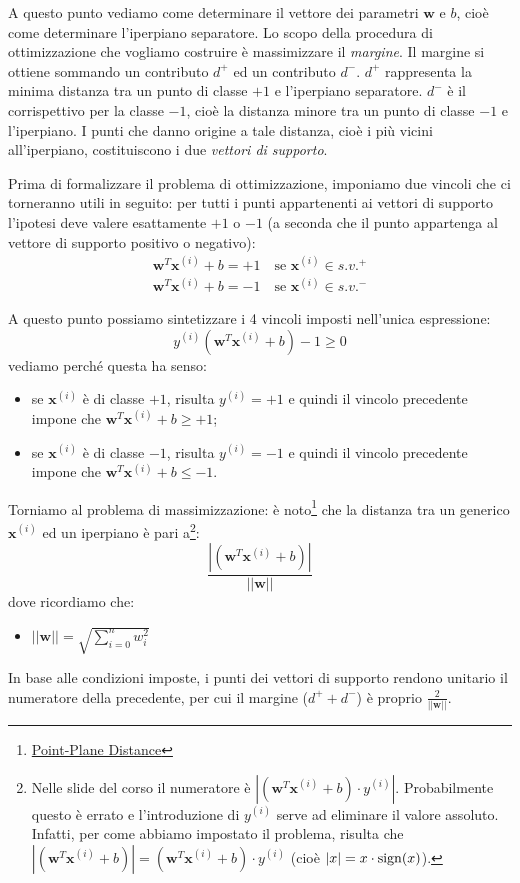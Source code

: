 A questo punto vediamo come determinare il vettore dei parametri $\mathbf{w}$ e $b$, cioè come determinare l'iperpiano separatore. Lo scopo della procedura di ottimizzazione che vogliamo costruire è massimizzare il \emph{margine}. Il margine si ottiene sommando un contributo $d^+$ ed un contributo $d^-$. $d^+$ rappresenta la minima distanza tra un punto di classe $+1$ e l'iperpiano separatore. $d^-$ è il corrispettivo per la classe $-1$, cioè la distanza minore tra un punto di classe $-1$ e l'iperpiano. I punti che danno origine a tale distanza, cioè i più vicini all'iperpiano, costituiscono i due \emph{vettori di supporto}.

Prima di formalizzare il problema di ottimizzazione, imponiamo due vincoli che ci torneranno utili in seguito: per tutti i punti appartenenti ai vettori di supporto l'ipotesi deve valere esattamente $+1$ o $-1$ (a seconda che il punto appartenga al vettore di supporto positivo o negativo):
\begin{gather*}
\mathbf{w}^T \mathbf{x}^{(i)} + b = +1 \quad \text{se }  \mathbf{x}^{(i)} \in s.v.^+\\
\mathbf{w}^T \mathbf{x}^{(i)} + b = -1 \quad \text{se }  \mathbf{x}^{(i)} \in s.v.^-
\end{gather*}

A questo punto possiamo sintetizzare i 4 vincoli imposti nell'unica espressione:
\begin{equation*}
y^{(i)}\left(\mathbf{w}^T \mathbf{x}^{(i)} + b\right) -1 \geq 0
\end{equation*}
vediamo perché questa ha senso:
\begin{itemize}
\item se  $\mathbf{x}^{(i)}$ è di classe $+1$, risulta $y^{(i)}=+1$ e quindi il vincolo precedente impone che $\mathbf{w}^T \mathbf{x}^{(i)} + b \geq +1$;
\item se  $\mathbf{x}^{(i)}$ è di classe $-1$, risulta $y^{(i)}=-1$ e quindi il vincolo precedente impone che $\mathbf{w}^T \mathbf{x}^{(i)} + b \leq -1$.
\end{itemize}
Torniamo al problema di massimizzazione: è noto\footnote{\href{http://mathworld.wolfram.com/Point-PlaneDistance.html}{Point-Plane Distance}}  che la distanza tra un generico $\mathbf{x}^{(i)}$ ed un iperpiano è pari a\footnote{Nelle slide del corso il numeratore è $|(\mathbf{w}^T \mathbf{x}^{(i)} + b) \cdot  y^{(i)}|$. Probabilmente questo è errato e l'introduzione di $y^{(i)}$ serve ad eliminare il valore assoluto. Infatti, per come abbiamo impostato il problema, risulta che $|(\mathbf{w}^T \mathbf{x}^{(i)} + b)| = (\mathbf{w}^T \mathbf{x}^{(i)} + b) \cdot  y^{(i)}$ (cioè $|x| = x \cdot \operatorname*{sign}(x)$).}:
\begin{equation*}
\frac{ |(\mathbf{w}^T \mathbf{x}^{(i)} + b)|} {||\mathbf{w}||}
\end{equation*}
dove ricordiamo che:
\begin{itemize}
\item $||\mathbf{w}|| = \sqrt{\sum_{i=0}^n{w_i^2}}$
\end{itemize}
In base alle condizioni imposte, i punti dei vettori di supporto rendono unitario il numeratore della precedente, per cui il margine ($d^+ + d^-$) è proprio $\frac{2}{||\mathbf{w}||}$.

